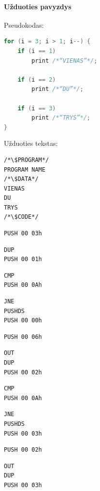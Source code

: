 \documentclass{scrartcl}
\begin{document}
            \paragraph{Užduoties pavyzdys} \mbox{}
            Pseudokodas:
            \begin{lstlisting}[language = c]
for (i = 3; i > 1; i--) {
    if (i == 1)
        print /*“VIENAS”*/;

    if (i == 2)
        print /*“DU”*/;

    if (i == 3)
        print /*“TRYS”*/;
}
            \end{lstlisting}
            Užduoties tekstas:
            \lstset{belowskip = 0.0mm, numbers = none}
            \begin{lstlisting}
/*\$PROGRAM*/
PROGRAM NAME
/*\$DATA*/
VIENAS
DU
TRYS
/*\$CODE*/
            \end{lstlisting}
            \lstset{aboveskip = 0.0mm, belowskip = 0.0mm, numbers = left}
            \begin{lstlisting}[firstnumber = 0]
PUSH 00 03h
            \end{lstlisting}
            \begin{lstlisting}[firstnumber = 3]
DUP
PUSH 00 01h
            \end{lstlisting}
            \begin{lstlisting}[firstnumber = 7]
CMP
PUSH 00 0Ah
            \end{lstlisting}
            \begin{lstlisting}[firstnumber = 11]
JNE
PUSHDS
PUSH 00 00h
            \end{lstlisting}
            \begin{lstlisting}[firstnumber = 16]
PUSH 00 06h
            \end{lstlisting}
            \begin{lstlisting}[firstnumber = 19]
OUT
DUP
PUSH 00 02h
            \end{lstlisting}
            \begin{lstlisting}[firstnumber = 24]
CMP
PUSH 00 0Ah
            \end{lstlisting}
            \begin{lstlisting}[firstnumber = 28]
JNE
PUSHDS
PUSH 00 03h
            \end{lstlisting}
            \begin{lstlisting}[firstnumber = 33]
PUSH 00 02h
            \end{lstlisting}
            \begin{lstlisting}[firstnumber = 36]
OUT
DUP
PUSH 00 03h
            \end{lstlisting}
\end{document}

